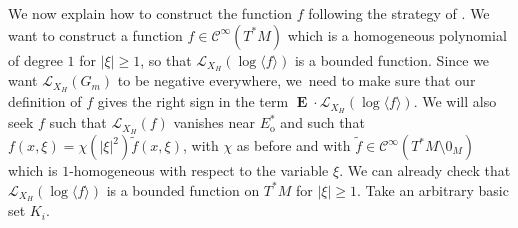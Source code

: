 \documentclass[11pt]{article}
\newcommand{\ro}{\mathrm{o}}
\theoremstyle{definition}
\theoremstyle{plain}
\newcommand{\Ccal}{\mathcal{C}}
\newcommand{\Lie}{\mathcal{L}}
\newcommand{\w}[1]{\langle {#1} \rangle}
\DeclareMathOperator{\E}{\boldsymbol{E}}
\begin{document}
We now explain how to construct the function $f$ following the strategy of \cite{FS,dyatlov-zworski}. We want to construct a function $f \in \Ccal^{\infty} (T^*M)$ which is a homogeneous polynomial of degree $1$ for $|\xi| \geq 1$, so that $\Lie_{X_H} (\log \w{f})$ is a bounded function. Since we want $\Lie_{X_H}(G_m)$ to be negative everywhere, we~need to make sure that our definition of $f$ gives the right sign in the term $\E \cdot\Lie_{X_H}(\log \w{f})$. We will also seek $f$ such that $\Lie_{X_H} (f)$ vanishes near $E_\ro^*$ and such that $f(x,\xi) = \chi (|\xi|^2) \tilde{f} (x,\xi)$, with $\chi$ as before and with $\tilde{f} \in \Ccal^{\infty}(T^* M \setminus 0_M)$ which is $1$-homogeneous with respect to the variable $\xi$. We can already check that $\Lie_{X_H} (\log \w{f})$ is a bounded function on $T^* M$ for $|\xi| \geq 1$. Take an arbitrary basic set $K_i$.
\end{document}
